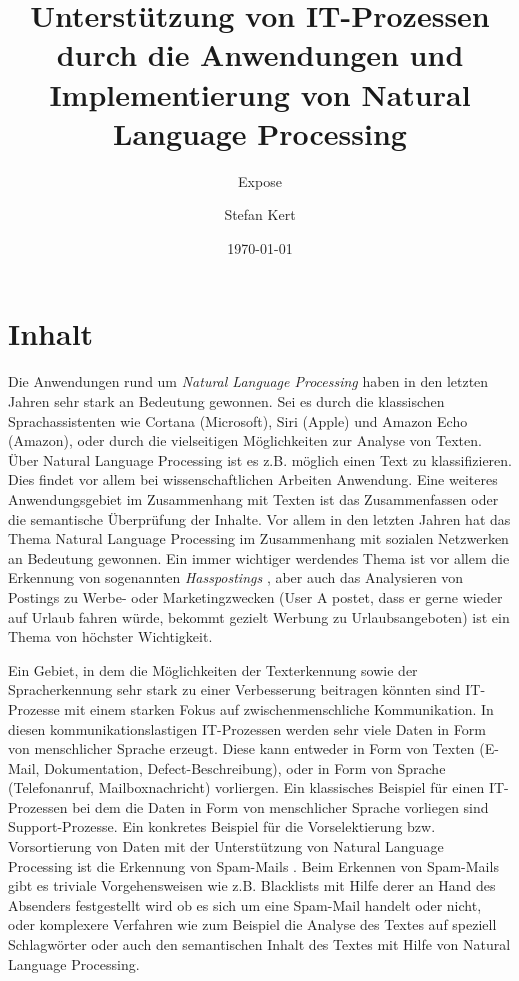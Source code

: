 \documentclass[a4paper]{scrartcl}
\begin{document}
\title{Unterstützung von IT-Prozessen durch die Anwendungen und Implementierung von Natural Language Processing}
\subtitle{Expose}
\author{Stefan Kert}
\date{\today}
\maketitle

\section{Inhalt}
Die Anwendungen rund um \textit{Natural Language Processing} haben in den letzten Jahren sehr stark an Bedeutung gewonnen. Sei es durch die klassischen Sprachassistenten wie Cortana (Microsoft), Siri (Apple) und Amazon Echo (Amazon), oder durch die vielseitigen Möglichkeiten zur Analyse von Texten. Über Natural Language Processing ist es z.B. möglich einen Text zu klassifizieren. Dies findet vor allem bei wissenschaftlichen Arbeiten Anwendung. Eine weiteres Anwendungsgebiet im Zusammenhang mit Texten ist das Zusammenfassen oder die semantische Überprüfung der Inhalte. Vor allem in den letzten Jahren hat das Thema Natural Language Processing im Zusammenhang mit sozialen Netzwerken an Bedeutung gewonnen. Ein immer wichtiger werdendes Thema ist vor allem die Erkennung von sogenannten \textit{Hasspostings} \cite{Nobata2016}, aber auch das Analysieren von Postings zu Werbe- oder Marketingzwecken (User A postet, dass er gerne wieder auf Urlaub fahren würde, bekommt gezielt Werbung zu Urlaubsangeboten) ist ein Thema von höchster Wichtigkeit.

Ein Gebiet, in dem die Möglichkeiten der Texterkennung sowie der Spracherkennung sehr stark zu einer Verbesserung beitragen könnten sind IT-Prozesse mit einem starken Fokus auf zwischenmenschliche Kommunikation. In diesen kommunikationslastigen IT-Prozessen werden sehr viele Daten in Form von menschlicher Sprache erzeugt. Diese kann entweder in Form von Texten (E-Mail, Dokumentation, Defect-Beschreibung), oder in Form von Sprache (Telefonanruf, Mailboxnachricht) vorliergen. Ein klassisches Beispiel für einen IT-Prozessen bei dem die Daten in Form von menschlicher Sprache vorliegen sind Support-Prozesse. Ein konkretes Beispiel für die Vorselektierung bzw. Vorsortierung von Daten mit der Unterstützung von Natural Language Processing ist die Erkennung von Spam-Mails \cite{Dinsoreanu2014}. Beim Erkennen von Spam-Mails gibt es triviale Vorgehensweisen wie z.B. Blacklists mit Hilfe derer an Hand des Absenders festgestellt wird ob es sich um eine Spam-Mail handelt oder nicht, oder komplexere Verfahren wie zum Beispiel die Analyse des Textes auf speziell Schlagwörter oder auch den semantischen Inhalt des Textes mit Hilfe von Natural Language Processing.
\end{document}
